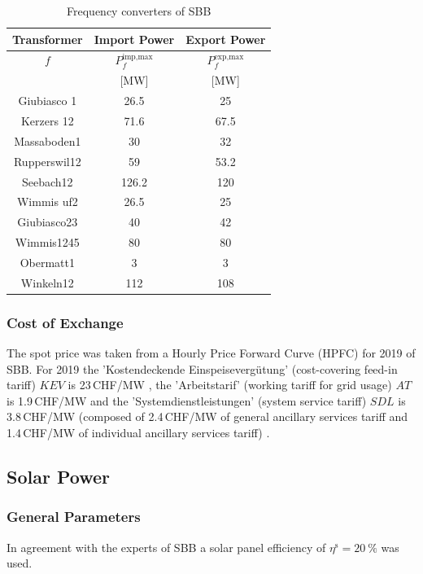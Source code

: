 \begin{table}[h!]
    \centering
    \begin{tabular}{|c|c|c|}
        \hline
         \textbf{Transformer} & \textbf{Import Power} & \textbf{Export Power} \\ \hline
         $f$ & $P^{\text{imp,max}}_{f}$ & $P^{\text{exp,max}}_{f}$ \\
         & [MW] & [MW] \\\hline
        Giubiasco 1     & 26.5  & 25    \\\hline
        Kerzers 12      & 71.6  & 67.5    \\\hline
        Massaboden1     & 30    & 32   \\\hline
        Rupperswil12    & 59    & 53.2     \\\hline
        Seebach12       & 126.2 & 120  \\\hline
        Wimmis uf2      & 26.5  & 25   \\\hline
        Giubiasco23     & 40    & 42   \\\hline
        Wimmis1245      & 80    & 80   \\\hline
        Obermatt1       & 3     & 3      \\\hline
        Winkeln12       & 112   & 108      \\\hline
 
    \end{tabular}
    \caption{Frequency converters of SBB}
    \label{tab:sbb_freqtrans}
\end{table}

\subsubsection{Cost of Exchange}
The spot price was taken from a Hourly Price Forward Curve (HPFC) for 2019 of SBB. For 2019 the 'Kostendeckende Einspeisevergütung' (cost-covering feed-in tariff) $KEV$ is 23\,CHF/MW \cite{KEV}, the 'Arbeitstarif' (working tariff for grid usage) $AT$ is  1.9\,CHF/MW and the 'Systemdienstleistungen' (system service tariff) $SDL$ is 3.8\,CHF/MW (composed of 2.4\,CHF/MW of general ancillary services tariff and 1.4\,CHF/MW of individual ancillary services tariff) \cite{tariff}. 

\subsection{Solar Power}\label{chap:data solar}
\subsubsection{General Parameters}
In agreement with the experts of SBB a solar panel efficiency of $\eta^\text{s} = \SI{20}{\percent}$ was used. 

